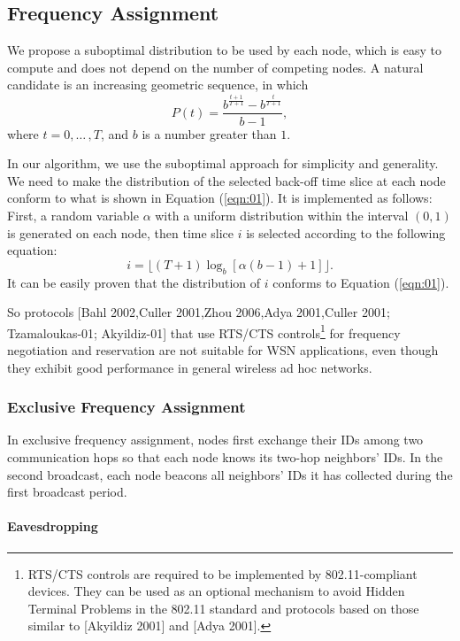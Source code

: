 \subsection{Frequency Assignment}

We propose a suboptimal distribution to be used by each node, which is
easy to compute and does not depend on the number of competing
nodes. A natural candidate is an increasing geometric sequence, in
which
\begin{equation}
\label{eqn:01}
P(t)=\frac{b^{\frac{t+1}{T+1}}-b^{\frac{t}{T+1}}}{b-1},
\end{equation}
where $t=0,{\ldots}\,,T$, and $b$ is a number greater than $1$.

In our algorithm, we use the suboptimal approach for simplicity and
generality. We need to make the distribution of the selected back-off
time slice at each node conform to what is shown in Equation
(\ref{eqn:01}). It is implemented as follows: First, a random
variable $\alpha$ with a uniform distribution within the interval
$(0, 1)$ is generated on each node, then time slice $i$ is selected
according to the following equation:
\[
i=\lfloor(T+1)\log_b[\alpha(b-1)+1]\rfloor.
\]
It can be easily proven that the distribution of $i$ conforms to Equation
(\ref{eqn:01}).

So protocols [Bahl 2002,Culler 2001,Zhou 2006,Adya 2001,Culler 2001;
Tzamaloukas-01; Akyildiz-01] that use RTS/CTS
controls\footnote{RTS/CTS controls are required to be implemented by
802.11-compliant devices. They can be used as an optional mechanism
to avoid Hidden Terminal Problems in the 802.11 standard and
protocols based on those similar to [Akyildiz 2001] and
[Adya 2001].} for frequency negotiation and reservation are not
suitable for WSN applications, even though they exhibit good
performance in general wireless ad hoc
networks.

\subsubsection{Exclusive Frequency Assignment}

In exclusive frequency assignment, nodes first exchange their IDs
among two communication hops so that each node knows its two-hop
neighbors' IDs. In the second broadcast, each node beacons all
neighbors' IDs it has collected during the first broadcast period.

\paragraph{Eavesdropping}

